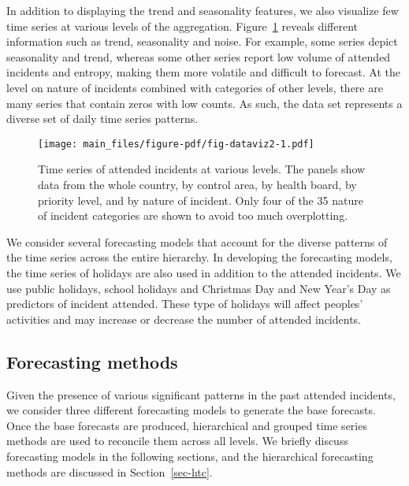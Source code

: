 \documentclass[
  authoryear,
  preprint,
  3p]{elsarticle}
\begin{document}
In addition to displaying the trend and seasonality features, we also
visualize few time series at various levels of the aggregation.
Figure~\ref{fig-dataviz2} reveals different information such as trend,
seasonality and noise. For example, some series depict seasonality and
trend, whereas some other series report low volume of attended incidents
and entropy, making them more volatile and difficult to forecast. At the
level on nature of incidents combined with categories of other levels,
there are many series that contain zeros with low counts. As such, the
data set represents a diverse set of daily time series patterns.

\begin{figure}

{\centering \texttt{[image: main\_files/figure-pdf/fig-dataviz2-1.pdf]}

}

\caption{\label{fig-dataviz2}Time series of attended incidents at
various levels. The panels show data from the whole country, by control
area, by health board, by priority level, and by nature of incident.
Only four of the 35 nature of incident categories are shown to avoid too
much overplotting.}

\end{figure}

We consider several forecasting models that account for the diverse
patterns of the time series across the entire hierarchy. In developing
the forecasting models, the time series of holidays are also used in
addition to the attended incidents. We use public holidays, school
holidays and Christmas Day and New Year's Day as predictors of incident
attended. These type of holidays will affect peoples' activities and may
increase or decrease the number of attended incidents.

\hypertarget{forecasting-methods}{%
\subsection{Forecasting methods}\label{forecasting-methods}}

Given the presence of various significant patterns in the past attended
incidents, we consider three different forecasting models to generate
the base forecasts. Once the base forecasts are produced, hierarchical
and grouped time series methods are used to reconcile them across all
levels. We briefly discuss forecasting models in the following sections,
and the hierarchical forecasting methods are discussed in
Section~\ref{sec-htc}.
\end{document}
